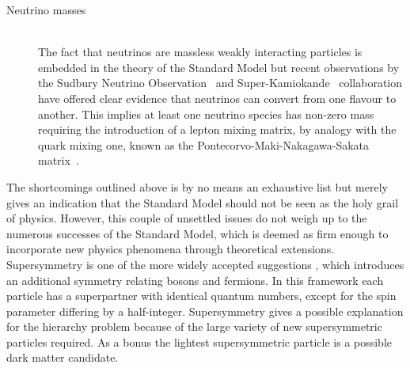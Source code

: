 \begin{myindentpar}
\begin{description}
    \item[Neutrino masses] \hfill \\
    The fact that neutrinos are massless weakly interacting particles is embedded in the theory of the Standard Model but recent observations by the Sudbury Neutrino Observation~\cite{SNOCollab} and Super-Kamiokande~\cite{SuperKamiokande} collaboration have offered clear evidence that neutrinos can convert from one flavour to another. This implies at least one neutrino species has non-zero mass requiring the introduction of a lepton mixing matrix, by analogy with the quark mixing one, known as the Pontecorvo-Maki-Nakagawa-Sakata matrix~\cite{NeutrinoMatrix1, NeutrinoMatrix2}.
        
   \end{description}
\end{myindentpar}
The shortcomings outlined above is by no means an exhaustive list but merely gives an indication that the Standard Model should not be seen as the holy grail of physics. However, this couple of unsettled issues do not weigh up to the numerous successes of the Standard Model, which is deemed as firm enough to incorporate new physics phenomena through theoretical extensions.
\\
Supersymmetry is one of the more widely accepted suggestions%
, which introduces an additional symmetry relating bosons and fermions.
In this framework each particle has a superpartner with identical quantum numbers, except for the spin parameter differing by a half-integer.
Supersymmetry gives a possible explanation for the hierarchy problem because of the large variety of new supersymmetric particles required. 
As a bonus the lightest supersymmetric particle is a possible dark matter candidate.
\\
